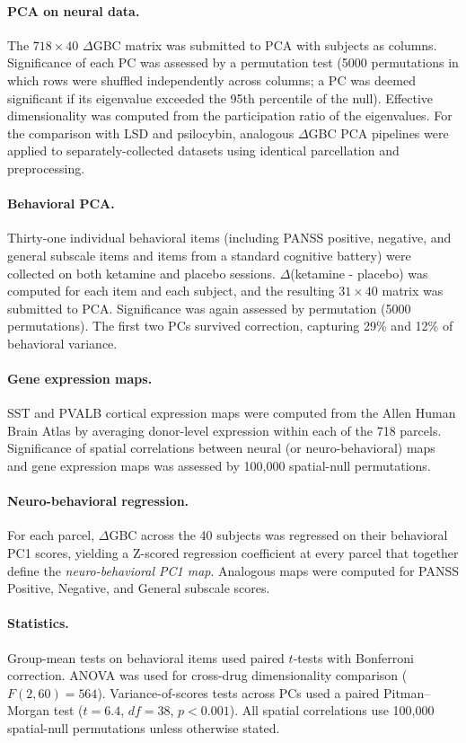 \documentclass[11pt]{article}
\begin{document}
\paragraph{PCA on neural data.} The $718 \times 40$ $\Delta$GBC matrix was
submitted to PCA with subjects as columns. Significance of each PC was
assessed by a permutation test (5000 permutations in which rows were
shuffled independently across columns; a PC was deemed significant if its
eigenvalue exceeded the 95th percentile of the null). Effective
dimensionality was computed from the participation ratio of the
eigenvalues. For the comparison with LSD and psilocybin, analogous
$\Delta$GBC PCA pipelines were applied to separately-collected datasets
using identical parcellation and preprocessing.

\paragraph{Behavioral PCA.} Thirty-one individual behavioral items
(including PANSS positive, negative, and general subscale items
\citep{kay1987positive} and items from a standard cognitive battery) were
collected on both ketamine and placebo sessions. $\Delta$(ketamine -
placebo) was computed for each item and each subject, and the resulting
$31 \times 40$ matrix was submitted to PCA. Significance was again assessed
by permutation (5000 permutations). The first two PCs survived correction,
capturing 29\% and 12\% of behavioral variance.

\paragraph{Gene expression maps.} SST and PVALB cortical expression maps
were computed from the Allen Human Brain Atlas
\citep{hawrylycz2012anatomically} by averaging donor-level expression
within each of the 718 parcels. Significance of spatial correlations
between neural (or neuro-behavioral) maps and gene expression maps was
assessed by 100{,}000 spatial-null permutations.

\paragraph{Neuro-behavioral regression.} For each parcel, $\Delta$GBC
across the 40 subjects was regressed on their behavioral PC1 scores,
yielding a Z-scored regression coefficient at every parcel that together
define the \emph{neuro-behavioral PC1 map}. Analogous maps were computed
for PANSS Positive, Negative, and General subscale scores.

\paragraph{Statistics.} Group-mean tests on behavioral items used paired
$t$-tests with Bonferroni correction. ANOVA was used for cross-drug
dimensionality comparison ($F(2,60)=564$). Variance-of-scores tests across
PCs used a paired Pitman--Morgan test ($t=6.4$, $df=38$, $p<0.001$). All
spatial correlations use 100{,}000 spatial-null permutations unless
otherwise stated.



\end{document}
